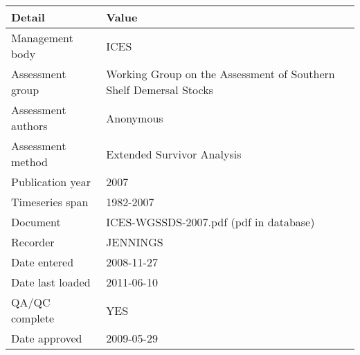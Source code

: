 \begin{table}[htb]
\centering
\begin{tabular}{lp{7cm}}
\toprule
Detail & Value \\
\midrule
Management body    & ICES                                                              \\
Assessment group   & Working Group on the Assessment of Southern Shelf Demersal Stocks \\
Assessment authors & Anonymous                                                         \\
Assessment method  & Extended Survivor Analysis                                        \\
Publication year   & 2007                                                              \\
Timeseries span    & 1982-2007                                                         \\
Document           & ICES-WGSSDS-2007.pdf (pdf in database)                            \\
Recorder           & JENNINGS                                                          \\
Date entered       & 2008-11-27                                                        \\
Date last loaded   & 2011-06-10                                                        \\
QA/QC complete     & YES                                                               \\
Date approved      & 2009-05-29                                                        \\
\bottomrule
\end{tabular}
\label{tab:assessdet}
\end{table}
